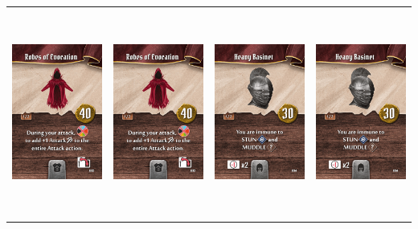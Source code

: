 \documentclass{minimal}
\begin{document}
{\begin{longtable}{llll}
\includegraphics[width=44mm,height=68mm]{./36-42/gh-037-robes-of-evocation.png} &
\includegraphics[width=44mm,height=68mm]{./36-42/gh-037-robes-of-evocation.png} &
\includegraphics[width=44mm,height=68mm]{./36-42/gh-038-heavy-basinet.png} &
\includegraphics[width=44mm,height=68mm]{./36-42/gh-038-heavy-basinet.png}\\ 

\end{longtable}}
\end{document}
